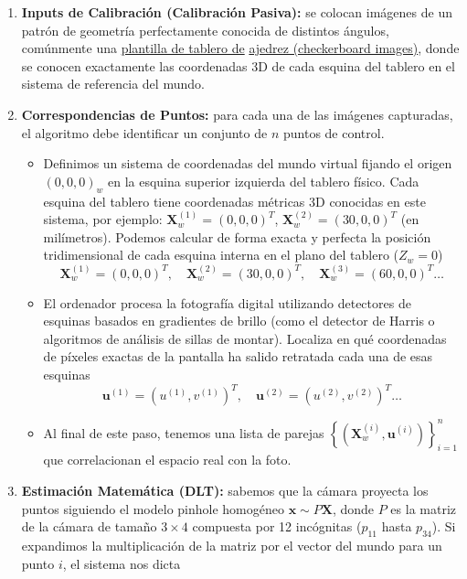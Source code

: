 \begin{enumerate}
    \item \textbf{Inputs de Calibración (Calibración Pasiva):} se colocan imágenes de un patrón de geometría perfectamente conocida de distintos ángulos, comúnmente una \underline{plantilla de tablero de} \underline{ajedrez (checkerboard images)}, donde se conocen exactamente las coordenadas 3D de cada esquina del tablero en el sistema de referencia del mundo.
    \item \textbf{Correspondencias de Puntos:} para cada una de las imágenes capturadas, el algoritmo debe identificar un conjunto de $n$ puntos de control.
    \begin{itemize}
        \item Definimos un sistema de coordenadas del mundo virtual fijando el origen $(0,0,0)_w$ en la esquina superior izquierda del tablero físico. Cada esquina del tablero tiene coordenadas métricas 3D conocidas en este sistema, por ejemplo: $\mathbf{X}_w^{(1)} = (0, 0, 0)^T$, $\mathbf{X}_w^{(2)} = (30, 0, 0)^T$ (en milímetros). Podemos calcular de forma exacta y perfecta la posición tridimensional de cada esquina interna en el plano del tablero ($Z_w=0$)
        $$\mathbf{X}_w^{(1)} = (0, 0, 0)^T, \quad \mathbf{X}_w^{(2)} = (30, 0, 0)^T, \quad \mathbf{X}_w^{(3)} = (60, 0, 0)^T \dots$$
        \item El ordenador procesa la fotografía digital utilizando detectores de esquinas basados en gradientes de brillo (como el detector de Harris o algoritmos de análisis de sillas de montar). Localiza en qué coordenadas de píxeles exactas de la pantalla ha salido retratada cada una de esas esquinas
        $$\mathbf{u}^{(1)} = (u^{(1)}, v^{(1)})^T, \quad \mathbf{u}^{(2)} = (u^{(2)}, v^{(2)})^T \dots$$
       
        \item Al final de este paso, tenemos una lista de parejas $\left\{ \left(\mathbf{X}_w^{(i)}, \mathbf{u}^{(i)}\right) \right\}_{i=1}^{n}$ que correlacionan el espacio real con la foto.
    \end{itemize}

    \item \textbf{Estimación Matemática (DLT):} sabemos que la cámara proyecta los puntos siguiendo el modelo pinhole homogéneo $\mathbf{x} \sim P\mathbf{X}$, donde $P$ es la matriz de la cámara de tamaño $3 \times 4$ compuesta por 12 incógnitas ($p_{11}$ hasta $p_{34}$). Si expandimos la multiplicación de la matriz por el vector del mundo para un punto $i$, el sistema nos dicta
    

\end{enumerate}
